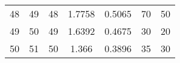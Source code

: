 \begin{table}
\begin{adjustbox}{width=1.2\textwidth,center=\textwidth}
\begin{tabular}{ccccccc}
48                                                        & 49                                                          & 48                                                  & 1.7758                                                                     & 0.5065                                                                    & 70                                                                          & 50                                                                               \\
49                                                        & 50                                                          & 49                                                  & 1.6392                                                                     & 0.4675                                                                    & 30                                                                          & 20                                                                               \\
50                                                        & 51                                                          & 50                                                  & 1.366                                                                      & 0.3896                                                                    & 35                                                                          & 30                                                                               \\
\hline
\end{tabular}
\end{adjustbox}
\end{table}
